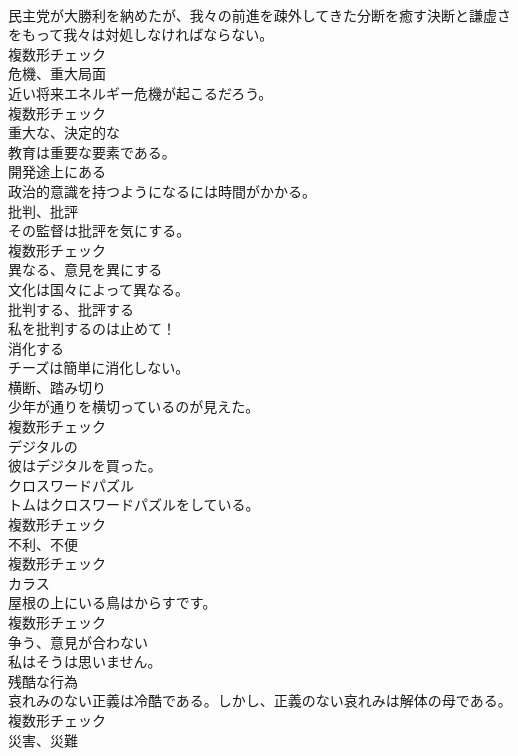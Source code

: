\documentclass[8pt]{extreport}
\begin{document}
\begin{CJK}{UTF8}{min}
\\	民主党が大勝利を納めたが、我々の前進を疎外してきた分断を癒す決断と謙虚さをもって我々は対処しなければならない。	
\\	複数形チェック
\\	[名詞]	危機、重大局面	
\\	近い将来エネルギー危機が起こるだろう。	
\\	複数形チェック
\\	[形容詞]	重大な、決定的な	
\\	教育は重要な要素である。	
\\	[形容詞]	開発途上にある	
\\	政治的意識を持つようになるには時間がかかる。	
\\	[名詞]	批判、批評	
\\	その監督は批評を気にする。	
\\	複数形チェック
\\	[動詞]	異なる、意見を異にする	
\\	文化は国々によって異なる。	
\\	[動詞]	批判する、批評する	
\\	私を批判するのは止めて！	
\\	[動詞]	消化する	
\\	チーズは簡単に消化しない。	
\\	[名詞]	横断、踏み切り	
\\	少年が通りを横切っているのが見えた。	
\\	複数形チェック
\\	[形容詞]	デジタルの	
\\	彼はデジタルを買った。	
\\	[名詞]	クロスワードパズル	
\\	トムはクロスワードパズルをしている。	
\\	複数形チェック
\\	[名詞]	不利、不便	
\\	複数形チェック
\\	[名詞]	カラス	
\\	屋根の上にいる鳥はからすです。	
\\	複数形チェック
\\	[動詞]	争う、意見が合わない	
\\	私はそうは思いません。	
\\	[名詞]	残酷な行為	
\\	哀れみのない正義は冷酷である。しかし、正義のない哀れみは解体の母である。	
\\	複数形チェック
\\	[名詞]	災害、災難	

\end{CJK}
\end{document}
